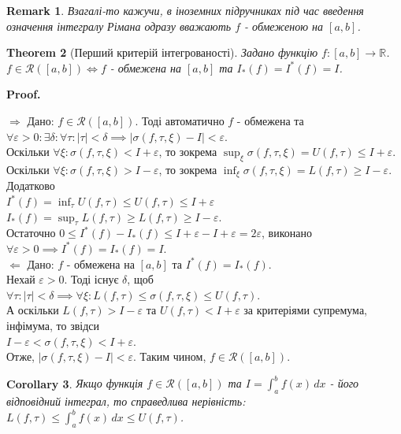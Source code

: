 \documentclass[a4paper, 10pt]{article}
\makeatletter
\def\huge{\displaystyle}
\def\qed{$\blacksquare$}
\def\rightproof{$\boxed{\Rightarrow}$ }
\def\leftproof{$\boxed{\Leftarrow}$ }
\theoremstyle{theoremdd}
\newtheorem{theorem}{Theorem}[subsection]
\theoremstyle{theoremdd}
\theoremstyle{theoremdd}
\theoremstyle{theoremdd}
\theoremstyle{theoremdd}
\theoremstyle{theoremdd}
\newtheorem{remark}[theorem]{Remark}
\theoremstyle{theoremdd}
\theoremstyle{theoremdd}
\newtheorem{corollary}[theorem]{Corollary}
\renewenvironment{proof}[1][Proof.\\]{\par
\pushQED{\hfill \qed}%
\normalfont \topsep6\p@\@plus6\p@\relax
\trivlist
\item\relax
{\bfseries
#1\@addpunct{.}}\hspace\labelsep\ignorespaces
}{%
\popQED\endtrivlist\@endpefalse
}
\makeatother
\begin{document}
\begin{remark}
Взагалі-то кажучи, в іноземних підручниках під час введення означення інтегралу Рімана одразу вважають $f$ - обмеженою на $[a,b]$.
\end{remark}

\begin{theorem}[Перший критерій інтегрованості]
Задано функцію $f: [a,b] \to \mathbb{R}$.\\
$f \in \mathcal{R}([a,b]) \iff f$ - обмежена на $[a,b]$ та $I_*(f) = I^*(f) = I$.
\end{theorem}

\begin{proof}
\rightproof Дано: $f \in \mathcal{R}([a,b])$. Тоді автоматично $f$ - обмежена та\\
$\forall \varepsilon > 0: \exists \delta: \forall \tau: |\tau| < \delta \implies |\sigma(f, \tau, \xi) - I| < \varepsilon$.\\
Оскільки $\forall \xi: \sigma(f, \tau, \xi) < I + \varepsilon$, то зокрема $\huge\sup_{\xi} \sigma(f, \tau, \xi) = U(f,\tau) \leq I + \varepsilon$.\\
Оскільки $\forall \xi: \sigma(f, \tau, \xi) > I - \varepsilon$, то зокрема $\huge\inf_{\xi} \sigma(f, \tau, \xi) = L(f,\tau) \geq I - \varepsilon$.\\
Додатково \\
$I^*(f) = \huge\inf_\tau U(f,\tau) \leq U(f,\tau) \leq I + \varepsilon$\\
$I_*(f) = \huge\sup_\tau L(f,\tau) \geq L(f,\tau) \geq I - \varepsilon$.\\
Остаточно $0 \leq I^*(f) - I_*(f) \leq I+\varepsilon - I + \varepsilon = 2\varepsilon$, виконано $\forall \varepsilon > 0 \implies I^*(f) = I_*(f) = I$.
\bigskip \\
\leftproof Дано: $f$ - обмежена на $[a,b]$ та $I^*(f) = I_*(f)$.\\
Нехай $\varepsilon > 0$. Тоді існує $\delta$, щоб $\forall \tau: |\tau| < \delta \implies \forall \xi: L(f,\tau) \leq \sigma(f, \tau, \xi) \leq U(f, \tau)$.\\
А оскільки $L(f,\tau) > I-\varepsilon$ та $U(f,\tau) < I + \varepsilon$ за критеріями супремума, інфімума, то звідси \\ $I-\varepsilon < \sigma(f, \tau, \xi) < I+\varepsilon$.\\
Отже, $|\sigma(f,\tau,\xi) - I| < \varepsilon$. Таким чином, $f \in \mathcal{R}([a,b])$.
\end{proof}

\begin{corollary}
Якщо функція $f \in \mathcal{R}([a,b])$ та $I = \huge\int_a^b f(x)\,dx$ - його відповідний інтеграл, то справедлива нерівність:\\
$L(f,\tau) \leq \huge\int_a^b f(x)\,dx \leq U(f, \tau)$.
\end{corollary}
\end{document}
